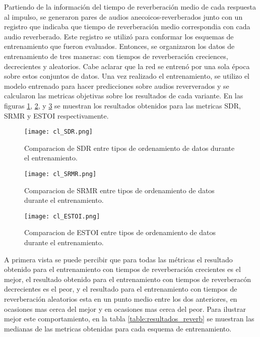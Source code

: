 Partiendo de la información del tiempo de reverberación medio de cada respuesta al impulso, se generaron pares de audios anecoicos-reverberados junto con un registro que indicaba que tiempo de reverberación medio correspondia con cada audio reverberado. Este registro se utilizó para conformar los esquemas de entrenamiento que fueron evaluados. Entonces, se organizaron los datos de entrenamiento de tres maneras: con tiempos de reverberación creciences, decrecientes y aleatorios. Cabe aclarar que la red se entrenó por una sola época sobre estos conjuntos de datos. Una vez realizado el entrenamiento, se utilizo el modelo entrenado para hacer predicciones sobre audios reververados y se calcularon las metricas objetivas sobre los resultados de cada variante. En las figuras \ref{fig:cl_sdr}, \ref{fig:cl_srmr}, y \ref{fig:cl_estoi} se muestran los resultados obtenidos para las metricas SDR, SRMR y ESTOI respectivamente. 

\begin{figure}[H]
	\centering{}
	\texttt{[image: cl\_SDR.png]}
	\caption{Comparacion de SDR entre tipos de ordenamiento de datos durante el entrenamiento.}
	\label{fig:cl_sdr}
\end{figure}

\begin{figure}[H]
	\centering{}
	\texttt{[image: cl\_SRMR.png]}
	\caption{Comparacion de SRMR entre tipos de ordenamiento de datos durante el entrenamiento.}
	\label{fig:cl_srmr}
\end{figure}

\begin{figure}[H]
	\centering{}
	\texttt{[image: cl\_ESTOI.png]}
	\caption{Comparacion de ESTOI entre tipos de ordenamiento de datos durante el entrenamiento.}
	\label{fig:cl_estoi}
\end{figure}

A primera vista se puede percibir que para todas las métricas el resultado obtenido para el entrenamiento con tiempos de reverberación crecientes es el mejor, el resultado obtenido para el entrenamiento con tiempos de reverberacón decrecientes es el peor, y el resultado para el entrenamiento con tiempos de reverberación aleatorios esta en un punto medio entre los dos anteriores, en ocasiones mas cerca del mejor y en ocasiones mas cerca del peor. Para ilustrar mejor este comportamiento, en la tabla \ref{table:resultados_reverb} se muestran las medianas de las metricas obtenidas para cada esquema de entrenamiento. 

